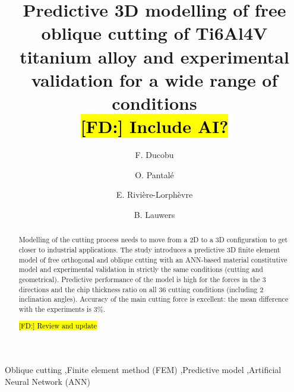 \documentclass[final,5p,times,twocolumn]{elsarticle}
\DeclareRobustCommand{\FD}[1]{ {\begingroup\sethlcolor{VWgreen}\textcolor{black}{\hl{[FD:] #1}}\endgroup} }
\begin{document}
\begin{frontmatter}

\title{Predictive 3D modelling of free oblique cutting of Ti6Al4V titanium alloy and experimental validation for a wide range of conditions\\ \FD{Include AI?}}

\author[1]{F. Ducobu}

\author[2]{O. Pantal\'{e}}
\author[1]{E. Rivi\`{e}re-Lorph\`{e}vre}
\author[3]{B. Lauwers}

\address[1]{Machine Design and Production Engineering Lab, Research Institute for Science and Material Engineering, UMONS, Belgium}
\address[2]{Laboratoire G\'{e}nie de Production, INP/ENIT, Universit\'{e} de Toulouse, Tarbes, France}
\address[3]{Department of Mechanical Engineering, KU Leuven \& Flanders Make@KU Leuven-MaPS, Belgium}

\begin{abstract}

Modelling of the cutting process needs to move from a 2D to a 3D configuration to get closer to industrial applications. The study introduces a predictive 3D finite element model of free orthogonal and oblique cutting with an ANN-based material constitutive model and experimental validation in strictly the same conditions (cutting and geometrical). Predictive performance of the model is high for the forces in the 3 directions and the chip thickness ratio on all 36 cutting conditions (including 2 inclination angles). Accuracy of the main cutting force is excellent: the mean difference with the experiments is 3\%.

\FD{Review and update}

\end{abstract}

\begin{keyword}

Oblique cutting \sep Finite element method (FEM) \sep Predictive model \sep Artificial Neural Network (ANN)

\end{keyword}

\end{frontmatter}

\linenumbers
\end{document}
